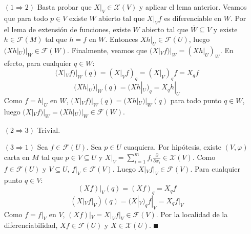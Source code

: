 \documentclass[Cursovd_portada.tex]{subfiles}
\begin{document}
\begin{dem}\mbox{}
\begin{enumerate}
\item[$(1 \Rightarrow 2)$] Basta probar que $X|_V \in \mathcal{X}(V)$ y aplicar el lema anterior. Veamos que para todo $p \in V$ existe $W$ abierto tal que $X|_V f$ es diferenciable en $W$. Por el lema de extensión de funciones, existe $W$ abierto tal que $\overline{W} \subseteq V$ y existe $h \in \mathcal{F}(M)$ tal que $h = f$ en $W$. Entonces $X h|_U \in \mathcal{F}(U)$, luego $(X h|_U)|_W \in \mathcal{F}(W)$. Finalmente, veamos que $(X|_V f)|_W = (X h |_U)_W$. En efecto, para cualquier $q \in W$:
\[ (X|_V f)|_W(q) = (X|_V f)_q = (X|_V)_q f = X_q f \]
\[ (X h|_U)|_W(q) = (X h|_U)_q = X_q h|_U \]
Como $f = h|_U$ en $W$, $(X|_V f)|_W(q) = (X h|_U)|_W(q)$ para todo punto $q \in W$, luego $(X|_V f)|_W = (X h|_U)|_W \in \mathcal{F}(W)$.
\item[$(2 \Rightarrow 3)$] Trivial.
\item[$(3 \Rightarrow 1)$] Sea $f \in \mathcal{F}(U)$. Sea $p \in U$ cuaquiera. Por hipótesis, existe $(V,φ)$ carta en $M$ tal que $p \in V \subseteq U$ y $X|_V = \sum_{i=1}^m f_i \frac{\partial}{\partial x_i} \in \mathcal{X}(V)$. Como $f \in \mathcal{F}(U)$ y $V \subseteq U$, $f|_V \in \mathcal{F}(V)$. Luego $X|_V f|_V \in \mathcal{F}(V)$. Para cualquier punto $q \in V$:
\[ (X f)|_V (q) = (X f)_q = X_q f \]
\[ (X|_V f|_V) (q) = (X|_V)_q f|_V = X_q f|_V \]
Como $f = f|_V$ en $V$, $(X f)|_V = X|_V f|_V \in \mathcal{F}(V)$. Por la localidad de la diferenciabilidad, $X f \in \mathcal{F}(U)$ y $X \in \mathcal{X}(U)$. $\QED$
\end{enumerate}
\end{dem}

\
\end{document}
